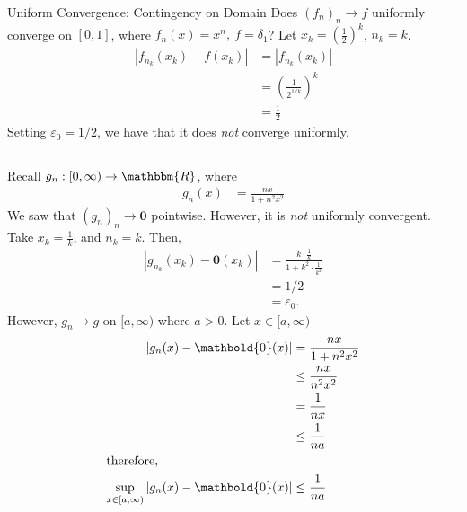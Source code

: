\documentclass[10pt]{extarticle}
\renewcommand{\mathbf}[1]{\mathbold{#1}}
\newcommand{\R}{\mathbbm{R}}
\begin{document}
  \begin{problem}{Uniform Convergence: Contingency on Domain}
    Does $\left(f_n\right)_n \rightarrow f$ uniformly converge on $[0,1]$, where $f_n(x) = x^n,~f = \delta_1$?
    \tcblower
    Let $x_k = \left(\frac{1}{2}\right)^k$, $n_k = k$.
    \begin{align*}
      \left|f_{n_k}(x_k) - f(x_k)\right| &= \left|f_{n_k}(x_k)\right|\\
                                         &= \left(\frac{1}{2^{1/k}}\right)^k\\
                                         &= \frac{1}{2}
    \end{align*}
    Setting $\varepsilon_0 = 1/2$, we have that it does \textit{not} converge uniformly.\\
    \vspace{4pt}
    \rule{\textwidth}{0.4pt}
    \vspace{4pt}
    Recall $g_n: [0,\infty)\rightarrow \R$, where
    \begin{align*}
      g_n(x) &= \frac{nx}{1 + n^2x^2}
    \end{align*}
    We saw that $(g_n)_n \rightarrow \mathbf{0}$ pointwise. However, it is \textit{not} uniformly convergent. Take $x_k = \frac{1}{k}$, and $n_k = k$. Then,
    \begin{align*}
      \left|g_{n_k}(x_k) - \mathbf{0}(x_k)\right| &= \frac{k\cdot \frac{1}{k}}{1 + k^2\cdot \frac{1}{k^2}}\\
                                                  &= 1/2\\
                                                  &= \varepsilon_0.
    \end{align*}
    However, $g_n \rightarrow g$ on $[a,\infty)$ where $a > 0$. Let $x\in[a,\infty)$
    \begin{align*}
      \left|g_n(x) - \mathbf{0}(x)\right| &= \frac{nx}{1 + n^2x^2}\\
                                          &\leq \frac{nx}{n^2x^2}\\
                                          &= \frac{1}{nx}\\
                                          &\leq \frac{1}{na}\\
                                          \shortintertext{therefore,}
      \sup_{x\in[a,\infty)}\left|g_{n}(x)-\mathbf{0}(x)\right| &\leq \frac{1}{na}
    \end{align*}
  \end{problem}
\end{document}
